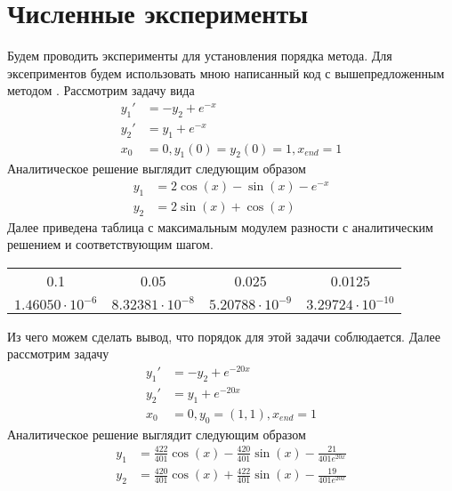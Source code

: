 \documentclass[a4paper,article,14pt]{extarticle}
\begin{document}
\section{Численные эксперименты}
Будем проводить эксперименты для установления порядка метода. Для эксеприментов будем использовать мною написанный код с вышепредложенным методом \cite{code}. \newline
Рассмотрим задачу вида
\begin{equation}
\begin{aligned}
    y_{1}' &= -y_{2} + e^{-x} \\
    y_{2}' &= y_{1} + e^{-x} \\
    x_{0} &= 0, y_{1}(0) = y_{2}(0) = 1, x_{end} = 1
\end{aligned}
\end{equation}
Аналитическое решение выглядит следующим образом
\begin{equation}
\begin{aligned}
    y_{1} &= 2 \cos(x) - \sin(x) - e^{-x} \\
    y_{2} &= 2 \sin(x) + \cos(x)
\end{aligned}
\end{equation}
Далее приведена таблица с максимальным модулем разности с аналитическим решением и соответствующим шагом. 
\begin{center}
\begin{tabular}{ |c|c|c|c| } 
\hline
0.1& 0.05 & 0.025 & 0.0125 \\ 
$1.46050\cdot10^{-6}$ & $8.32381\cdot10^{-8}$ & $5.20788\cdot10^{-9}$ & $3.29724\cdot10^{-10}$ \\ 
\hline
\end{tabular}
\end{center}
Из чего можем сделать вывод, что порядок для этой задачи соблюдается.
Далее рассмотрим задачу
\begin{equation}
\begin{aligned}
    y_{1}' &= -y_{2} + e^{-20x} \\
    y_{2}' &= y_{1} + e^{-20x} \\
    x_{0} &= 0, y_{0} = (1,1), x_{end} = 1
\end{aligned}
\end{equation}
Аналитическое решение выглядит следующим образом
\begin{equation}
\begin{aligned}
    y_{1} &= \frac{422}{401} \cos(x) - \frac{420}{401} \sin(x) - \frac{21}{401 e^{20x}} \\
    y_{2} &= \frac{420}{401} \cos(x) + \frac{422}{401} \sin(x) - \frac{19}{401 e^{20x}}
\end{aligned}
\end{equation}
\end{document}
